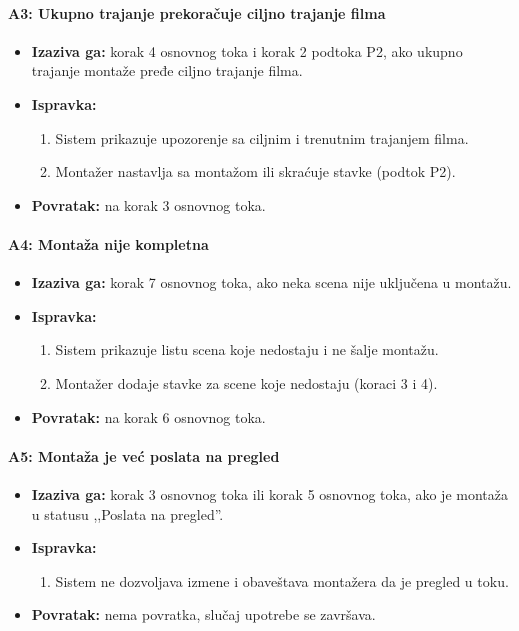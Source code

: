 \paragraph*{A3: Ukupno trajanje prekoračuje ciljno trajanje filma}
\begin{itemize}
    \item \textbf{Izaziva ga:} korak 4 osnovnog toka i korak 2 podtoka P2, ako ukupno trajanje montaže pređe ciljno trajanje filma.
    \item \textbf{Ispravka:}
    \begin{enumerate}
        \item Sistem prikazuje upozorenje sa ciljnim i trenutnim trajanjem filma.
        \item Montažer nastavlja sa montažom ili skraćuje stavke (podtok P2).
    \end{enumerate}
    \item \textbf{Povratak:} na korak 3 osnovnog toka.
\end{itemize}

\paragraph*{A4: Montaža nije kompletna}
\begin{itemize}
    \item \textbf{Izaziva ga:} korak 7 osnovnog toka, ako neka scena nije uključena u montažu.
    \item \textbf{Ispravka:}
    \begin{enumerate}
        \item Sistem prikazuje listu scena koje nedostaju i ne šalje montažu.
        \item Montažer dodaje stavke za scene koje nedostaju (koraci 3 i 4).
    \end{enumerate}
    \item \textbf{Povratak:} na korak 6 osnovnog toka.
\end{itemize}

\paragraph*{A5: Montaža je već poslata na pregled}
\begin{itemize}
    \item \textbf{Izaziva ga:} korak 3 osnovnog toka ili korak 5 osnovnog toka, ako je montaža u statusu ,,Poslata na pregled''.
    \item \textbf{Ispravka:}
    \begin{enumerate}
        \item Sistem ne dozvoljava izmene i obaveštava montažera da je pregled u toku.
    \end{enumerate}
    \item \textbf{Povratak:} nema povratka, slučaj upotrebe se završava.
\end{itemize}

